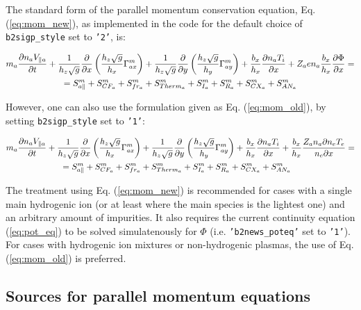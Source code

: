\documentclass[a4paper,10pt]{report}
\begin{document}
The standard form of the parallel momentum conservation equation, 
Eq. (\ref{eq:mom_new}), as implemented in the code
for the default choice of {\tt b2sigp\_style} set to {\tt '2'}, is:

\begin{align}\label{eq:mom_new}
m_a \frac{\partial n_a V_{\parallel a}}{\partial t} +
\frac 1{h_z\sqrt g} \frac{\partial}{\partial x} \left( \frac{h_z\sqrt g}{h_x} \Gamma_{ax}^m \right) &+
\frac 1{h_z\sqrt g} \frac{\partial}{\partial y} \left( \frac{h_z\sqrt g}{h_y} \Gamma_{ay}^m \right) +
\frac{b_x}{h_x}\frac{\partial n_a T_i}{\partial x} +
Z_a e n_a \frac{b_x}{h_x} \frac{\partial \Phi}{\partial x} = \notag \\
= S_{a \parallel}^m + S_{CF_a}^m + S_{fr_a}^m &+ S_{Therm_a}^{m} + S_{I_a}^m + S_{R_a}^m + S_{CX_a}^m + S_{AN_a}^m
\end{align}

However, one can also use the formulation given as Eq. (\ref{eq:mom_old}),
by setting {\tt b2sigp\_style} set to {\tt '1'}:

\begin{align}\label{eq:mom_old}
m_a \frac{\partial n_a V_{\parallel a}}{\partial t} +
\frac 1{h_z\sqrt g} \frac{\partial}{\partial x} \left( \frac{h_z \sqrt g}{h_x} \Gamma_{ax}^m \right) &+
\frac 1{h_z\sqrt g} \frac{\partial}{\partial y} \left( \frac{h_z \sqrt g}{h_y} \Gamma_{ay}^m \right) +
\frac{b_x}{h_x} \frac{\partial n_a T_i}{\partial x} +
\frac{b_x}{h_x} \frac{Z_a n_a \partial n_e T_e}{n_e \partial x} = \notag \\
= S_{a \parallel}^m + S_{CF_a}^m + S_{fr_a}^m &+ S_{Therm_a}^{m} + S_{I_a}^m + S_{R_a}^m + S_{CX_a}^m + S_{AN_a}^m
\end{align}

The treatment using Eq. (\ref{eq:mom_new}) is recommended for cases with a
single main hydrogenic ion (or at least where the main species is the lightest
one) and an arbitrary amount of impurities. It also requires the current
continuity equation (\ref{eq:pot_eq}) to be solved simulatenously for $\Phi$
(i.e. {\tt 'b2news\_poteq'} set to {\tt '1'}). For cases
with hydrogenic ion mixtures or non-hydrogenic plasmas, the use of Eq.
(\ref{eq:mom_old}) is preferred.


\subsection{Sources for parallel momentum equations}
\end{document}
